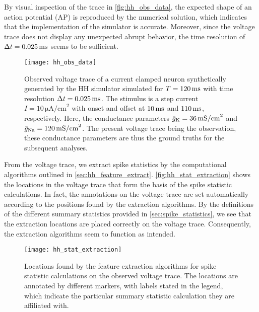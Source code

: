 By visual inspection of the trace in \autoref{fig:hh_obs_data}, the expected shape of an action potential (AP) is reproduced by the numerical solution, which indicates that the implementation of the simulator is accurate. Moreover, since the voltage trace does not display any unexpected abrupt behavior, the time resolution of $\Delta t=0.025 \,\mathrm{ms}$ seems to be sufficient. 

\begin{figure}[!htb]
    \centering
    \texttt{[image: hh\_obs\_data]}
    \caption{Observed voltage trace of a current clamped neuron synthetically generated by the HH simulator simulated for $T = 120 \,\mathrm{ms}$ with time resolution $\Delta t=0.025 \,\mathrm{ms}$. The stimulus is a step current $I = 10 \, \mathrm{\mu A/cm}^2$ with onset and offset at $10 \,\mathrm{ms}$ and $110 \,\mathrm{ms}$, respectively. Here, the conductance parameters $\bar{g}_{\mathrm{K}} = 36 \,\mathrm{mS/cm}^2$ and $\bar{g}_{\mathrm{Na}} = 120 \,\mathrm{mS/cm}^2$. The present voltage trace being the observation, these conductance parameters are thus the ground truths for the subsequent analyses.}
    \label{fig:hh_obs_data}
\end{figure} 

From the voltage trace, we extract spike statistics by the computational algorithms outlined in \cref{sec:hh_feature_extract}. \autoref{fig:hh_stat_extraction} shows the locations in the voltage trace that form the basis of the spike statistic calculations. In fact, the annotations on the voltage trace are set automatically according to the positions found by the extraction algorithms. By the definitions of the different summary statistics provided in \cref{sec:spike_statistics}, we see that the extraction locations are placed correctly on the voltage trace. Consequently, the extraction algorithms seem to function as intended. 

\begin{figure}[!htb]
    \centering
    \texttt{[image: hh\_stat\_extraction]}
    \caption{Locations found by the feature extraction algorithms for spike statistic calculations on the observed voltage trace. The locations are annotated by different markers, with labels stated in the legend, which indicate the particular summary statistic calculation they are affiliated with.}
    \label{fig:hh_stat_extraction}
\end{figure} 

